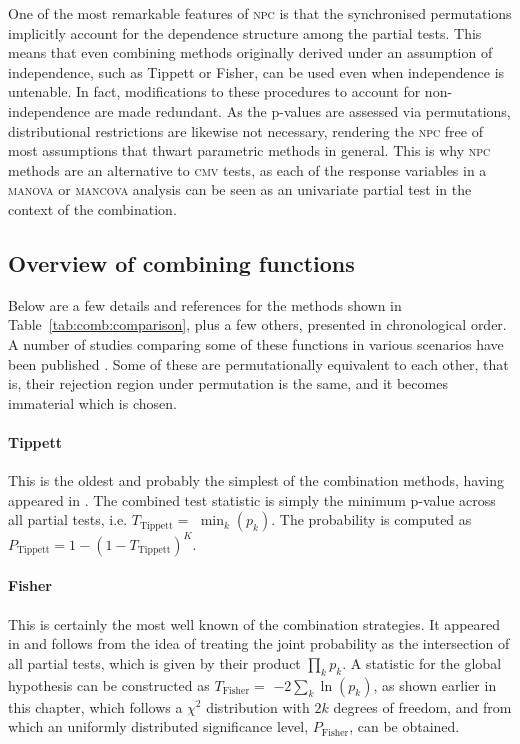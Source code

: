 One of the most remarkable features of \textsc{npc} is that the synchronised permutations implicitly account for the dependence structure among the partial tests. This means that even combining methods originally derived under an assumption of independence, such as Tippett or Fisher, can be used even when independence is untenable. In fact, modifications to these procedures to account for non-independence \citep[e.g.,][for the Fisher method]{Brown1975, Kost2002} are made redundant. As the p-values are assessed via permutations, distributional restrictions are likewise not necessary, rendering the \textsc{npc} free of most assumptions that thwart parametric methods in general. This is why \textsc{npc} methods are an alternative to \textsc{cmv} tests, as each of the response variables in a \textsc{manova} or \textsc{mancova} analysis can be seen as an univariate partial test in the context of the combination.

\subsection{Overview of combining functions}
\label{sec:comb:review}

Below are a few details and references for the methods shown in Table~\ref{tab:comb:comparison}, plus a few others, presented in chronological order. A number of studies comparing some of these functions in various scenarios have been published \citep{Birnbaum1954, vanZwet1967, Oosterhoff1969, Rosenthal1978, Berk1979, Westberg1985, Lazar2002, Loughin2004, Whitlock2005, Wu2006, Won2009, Bhandary2011, Chen2011_evo, Zaykin2011, Chang2013}. Some of these are permutationally equivalent to each other, that is, their rejection region under permutation is the same, and it becomes immaterial which is chosen.

\paragraph{Tippett} This is the oldest and probably the simplest of the combination methods, having appeared in \citet{Tippett1931}. The combined test statistic is simply the minimum p-value across all partial tests, i.e. $T_{\text{Tippett}} =$ $\min_{k} \left(p_{k}\right)$. The probability is computed as $P_{\text{Tippett}} = 1-\left(1-T_{\text{Tippett}}\right)^{K}$.

\paragraph{Fisher} This is certainly the most well known of the combination strategies. It appeared in \citet{Fisher1932} and follows from the idea of treating the joint probability as the intersection of all partial tests, which is given by their product $\prod_{k} p_{k}$. A statistic for the global hypothesis can be constructed as $T_{\text{Fisher}} =$ $-2 \sum_{k} \ln\left(p_{k}\right)$, as shown earlier in this chapter, which follows a $\chi^2$ distribution with $2k$ degrees of freedom, and from which an uniformly distributed significance level, $P_{\text{Fisher}}$, can be obtained.

